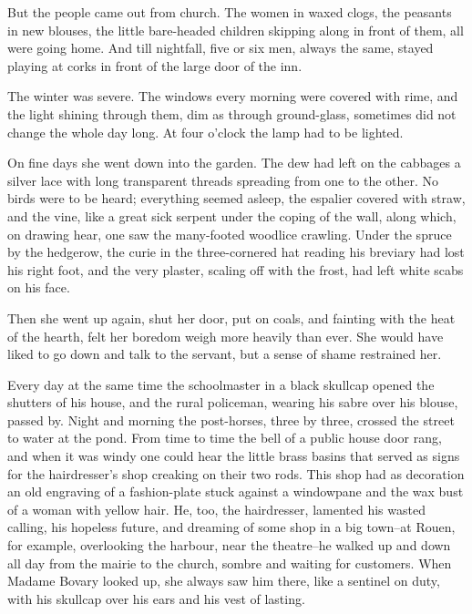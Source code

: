 \documentclass{tufte-book}
\begin{document}
But the people came out from church. The women in waxed clogs, the
peasants in new blouses, the little bare-headed children skipping along
in front of them, all were going home. And till nightfall, five or six
men, always the same, stayed playing at corks in front of the large door
of the inn.

The winter was severe. The windows every morning were covered with
rime, and the light shining through them, dim as through ground-glass,
sometimes did not change the whole day long. At four o'clock the lamp
had to be lighted.

On fine days she went down into the garden. The dew had left on the
cabbages a silver lace with long transparent threads spreading from one
to the other. No birds were to be heard; everything seemed asleep, the
espalier covered with straw, and the vine, like a great sick serpent
under the coping of the wall, along which, on drawing hear, one saw the
many-footed woodlice crawling. Under the spruce by the hedgerow, the
curie in the three-cornered hat reading his breviary had lost his right
foot, and the very plaster, scaling off with the frost, had left white
scabs on his face.

Then she went up again, shut her door, put on coals, and fainting with
the heat of the hearth, felt her boredom weigh more heavily than ever.
She would have liked to go down and talk to the servant, but a sense of
shame restrained her.

Every day at the same time the schoolmaster in a black skullcap opened
the shutters of his house, and the rural policeman, wearing his sabre
over his blouse, passed by. Night and morning the post-horses, three by
three, crossed the street to water at the pond. From time to time the
bell of a public house door rang, and when it was windy one could hear
the little brass basins that served as signs for the hairdresser's shop
creaking on their two rods. This shop had as decoration an old engraving
of a fashion-plate stuck against a windowpane and the wax bust of a
woman with yellow hair. He, too, the hairdresser, lamented his wasted
calling, his hopeless future, and dreaming of some shop in a big
town--at Rouen, for example, overlooking the harbour, near the
theatre--he walked up and down all day from the mairie to the church,
sombre and waiting for customers. When Madame Bovary looked up, she
always saw him there, like a sentinel on duty, with his skullcap over
his ears and his vest of lasting.
\end{document}
